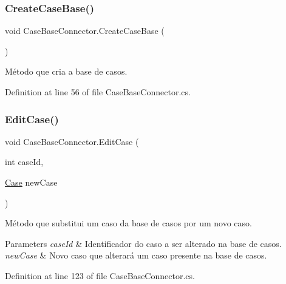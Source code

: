 \hypertarget{class_case_base_connector_a1aa00f0a3bcf25bafa6bab87ec1e455e}{}\label{class_case_base_connector_a1aa00f0a3bcf25bafa6bab87ec1e455e} 
\subsubsection{\texorpdfstring{Create\+Case\+Base()}{CreateCaseBase()}}
{\footnotesize\ttfamily void Case\+Base\+Connector.\+Create\+Case\+Base (\begin{DoxyParamCaption}{ }\end{DoxyParamCaption})}



Método que cria a base de casos. 



Definition at line 56 of file Case\+Base\+Connector.\+cs.

\hypertarget{class_case_base_connector_afc9618b6b8f22f9184e59a86086be239}{}\label{class_case_base_connector_afc9618b6b8f22f9184e59a86086be239} 
\subsubsection{\texorpdfstring{Edit\+Case()}{EditCase()}}
{\footnotesize\ttfamily void Case\+Base\+Connector.\+Edit\+Case (\begin{DoxyParamCaption}\item[{int}]{case\+Id,  }\item[{\hyperlink{class_case}{Case}}]{new\+Case }\end{DoxyParamCaption})}



Método que substitui um caso da base de casos por um novo caso. 


\begin{DoxyParams}{Parameters}
{\em case\+Id} & Identificador do caso a ser alterado na base de casos.\\
\hline
{\em new\+Case} & Novo caso que alterará um caso presente na base de casos.\\
\hline
\end{DoxyParams}


Definition at line 123 of file Case\+Base\+Connector.\+cs.

